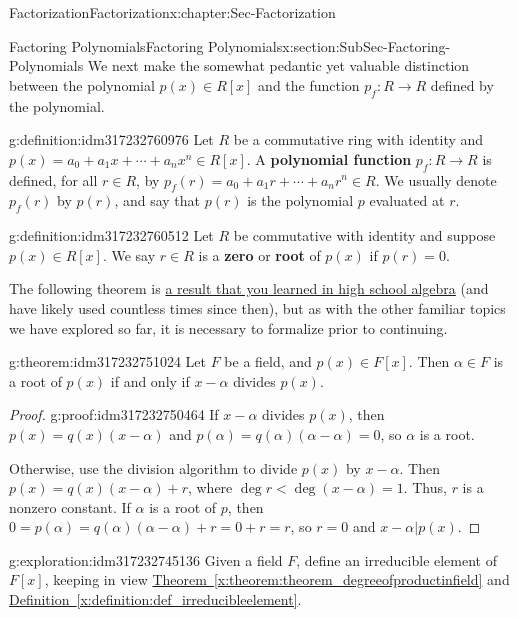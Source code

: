 \documentclass[oneside,10pt,]{book}
\newcommand{\xreffont}{\relax}
\newcommand{\terminology}[1]{\textbf{#1}}
\numberwithin{equation}{section}
\newcommand{\lt}{<}
\begin{document}
\begin{chapterptx}{Factorization}{}{Factorization}{}{}{x:chapter:Sec-Factorization}
\begin{sectionptx}{Factoring Polynomials}{}{Factoring Polynomials}{}{}{x:section:SubSec-Factoring-Polynomials}
We next make the somewhat pedantic \textemdash{} yet valuable \textemdash{} distinction between the polynomial \(p(x)\in R[x]\) and the function \(p_f : R\to R\) defined by the polynomial.%
\begin{definition}{}{g:definition:idm317232760976}%
Let \(R\) be a commutative ring with identity and \(p(x) = a_0 + a_1 x + \cdots + a_n x^n \in R[x]\). A \terminology{polynomial function} \(p_f : R \to R\) is defined, for all \(r\in R\), by \(p_f(r) = a_0 + a_1 r + \cdots + a_n r^n \in R\). We usually denote \(p_f(r)\) by \(p(r)\), and say that \(p(r)\) is the polynomial \(p\) evaluated at \(r\).%
\end{definition}
\begin{definition}{}{g:definition:idm317232760512}%
Let \(R\) be commutative with identity and suppose \(p(x) \in R[x]\). We say \(r\in R\) is a \terminology{zero} or \terminology{root} of \(p(x)\) if \(p(r) = 0\).%
\end{definition}
The following theorem is \href{http://www.corestandards.org/Math/Content/HSA/APR/B/2/}{a result that you learned in high school algebra} (and have likely used countless times since then), but as with the other familiar topics we have explored so far, it is necessary to formalize prior to continuing.%
\begin{theorem}{}{}{g:theorem:idm317232751024}%
Let \(F\) be a field, and \(p(x)\in F[x]\). Then \(\alpha\in F\) is a root of \(p(x)\) if and only if \(x-\alpha\) divides \(p(x)\).%
\end{theorem}
\begin{proof}{}{g:proof:idm317232750464}
If \(x-\alpha\) divides \(p(x)\), then \(p(x) = q(x) (x-\alpha)\) and \(p(\alpha) = q(\alpha) (\alpha - \alpha) = 0\), so \(\alpha\) is a root.%
\par
Otherwise, use the division algorithm to divide \(p(x)\) by \(x-\alpha\). Then \(p(x) = q(x)(x-\alpha) + r\), where \(\deg r \lt \deg (x-\alpha) = 1\). Thus, \(r\) is a nonzero constant. If \(\alpha\) is a root of \(p\), then \(0 = p(\alpha) = q(\alpha) (\alpha - \alpha) + r = 0 + r = r\), so \(r=0\) and \(x-\alpha | p(x)\).%
\end{proof}
\begin{exploration}{}{g:exploration:idm317232745136}%
Given a field \(F\), define an irreducible element of \(F[x]\), keeping in view \hyperref[x:theorem:theorem_degreeofproductinfield]{Theorem~{\xreffont\ref{x:theorem:theorem_degreeofproductinfield}}} and \hyperref[x:definition:def_irreducibleelement]{Definition~{\xreffont\ref{x:definition:def_irreducibleelement}}}.%

\end{exploration}
\end{sectionptx}
\end{chapterptx}
\end{document}
